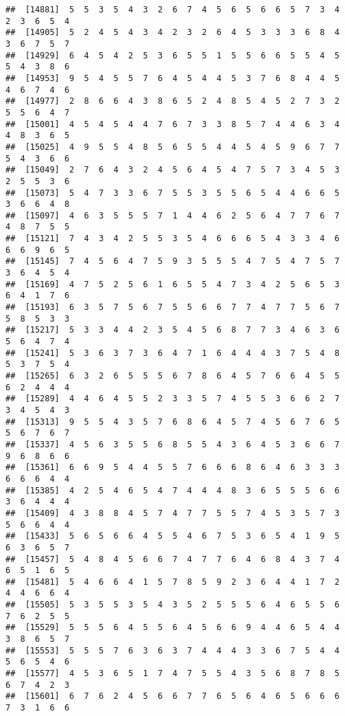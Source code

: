 \documentclass[
]{book}
\begin{document}
\begin{verbatim}
##  [14881]  5  5  3  5  4  3  2  6  7  4  5  6  5  6  6  5  7  3  4  2  3  6  5  4
##  [14905]  5  2  4  5  4  3  4  2  3  2  6  4  5  3  3  3  6  8  4  3  6  7  5  7
##  [14929]  6  4  5  4  2  5  3  6  5  5  1  5  5  6  6  5  5  4  5  5  4  3  8  6
##  [14953]  9  5  4  5  5  7  6  4  5  4  4  5  3  7  6  8  4  4  5  4  6  7  4  6
##  [14977]  2  8  6  6  4  3  8  6  5  2  4  8  5  4  5  2  7  3  2  5  5  6  4  7
##  [15001]  4  5  4  5  4  4  7  6  7  3  3  8  5  7  4  4  6  3  4  4  8  3  6  5
##  [15025]  4  9  5  5  4  8  5  6  5  5  4  4  5  4  5  9  6  7  7  5  4  3  6  6
##  [15049]  2  7  6  4  3  2  4  5  6  4  5  4  7  5  7  3  4  5  3  2  5  5  3  6
##  [15073]  5  4  7  3  3  6  7  5  5  3  5  5  6  5  4  4  6  6  5  3  6  6  4  8
##  [15097]  4  6  3  5  5  5  7  1  4  4  6  2  5  6  4  7  7  6  7  4  8  7  5  5
##  [15121]  7  4  3  4  2  5  5  3  5  4  6  6  6  5  4  3  3  4  6  6  6  9  6  5
##  [15145]  7  4  5  6  4  7  5  9  3  5  5  5  4  7  5  4  7  5  7  3  6  4  5  4
##  [15169]  4  7  5  2  5  6  1  6  5  5  4  7  3  4  2  5  6  5  3  6  4  1  7  6
##  [15193]  6  3  5  7  5  6  7  5  5  6  6  7  7  4  7  7  5  6  7  5  8  5  3  3
##  [15217]  5  3  3  4  4  2  3  5  4  5  6  8  7  7  3  4  6  3  6  5  6  4  7  4
##  [15241]  5  3  6  3  7  3  6  4  7  1  6  4  4  4  3  7  5  4  8  5  3  7  5  4
##  [15265]  6  3  2  6  5  5  5  6  7  8  6  4  5  7  6  6  4  5  5  6  2  4  4  4
##  [15289]  4  4  6  4  5  5  2  3  3  5  7  4  5  5  3  6  6  2  7  3  4  5  4  3
##  [15313]  9  5  5  4  3  5  7  6  8  6  4  5  7  4  5  6  7  6  5  5  6  7  6  7
##  [15337]  4  5  6  3  5  5  6  8  5  5  4  3  6  4  5  3  6  6  7  9  6  8  6  6
##  [15361]  6  6  9  5  4  4  5  5  7  6  6  6  8  6  4  6  3  3  3  6  6  6  4  4
##  [15385]  4  2  5  4  6  5  4  7  4  4  4  8  3  6  5  5  5  6  6  3  6  4  4  4
##  [15409]  4  3  8  8  4  5  7  4  7  7  5  5  7  4  5  3  5  7  3  5  6  6  4  4
##  [15433]  5  6  5  6  6  4  5  5  4  6  7  5  3  6  5  4  1  9  5  6  3  6  5  7
##  [15457]  5  4  8  4  5  6  6  7  4  7  7  6  4  6  8  4  3  7  4  6  5  1  6  5
##  [15481]  5  4  6  6  4  1  5  7  8  5  9  2  3  6  4  4  1  7  2  4  4  6  6  4
##  [15505]  5  3  5  5  3  5  4  3  5  2  5  5  5  6  4  6  5  5  6  7  6  2  5  5
##  [15529]  5  5  5  6  4  5  5  6  4  5  6  6  9  4  4  6  5  4  4  3  8  6  5  7
##  [15553]  5  5  5  7  6  3  6  3  7  4  4  4  3  3  6  7  5  4  4  5  6  5  4  6
##  [15577]  4  5  3  6  5  1  7  4  7  5  5  4  3  5  6  8  7  8  5  6  7  4  2  3
##  [15601]  6  7  6  2  4  5  6  6  7  7  6  5  6  4  6  5  6  6  6  7  3  1  6  6

\end{verbatim}
\end{document}

